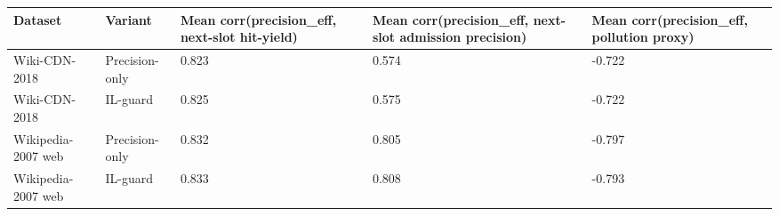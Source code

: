 \begin{tabular}{lllll}
\toprule
Dataset & Variant & Mean corr(precision\_eff, next-slot hit-yield) & Mean corr(precision\_eff, next-slot admission precision) & Mean corr(precision\_eff, pollution proxy) \\
\midrule
Wiki-CDN-2018 & Precision-only & 0.823 & 0.574 & -0.722 \\
Wiki-CDN-2018 & IL-guard & 0.825 & 0.575 & -0.722 \\
Wikipedia-2007 web & Precision-only & 0.832 & 0.805 & -0.797 \\
Wikipedia-2007 web & IL-guard & 0.833 & 0.808 & -0.793 \\
\bottomrule
\end{tabular}
